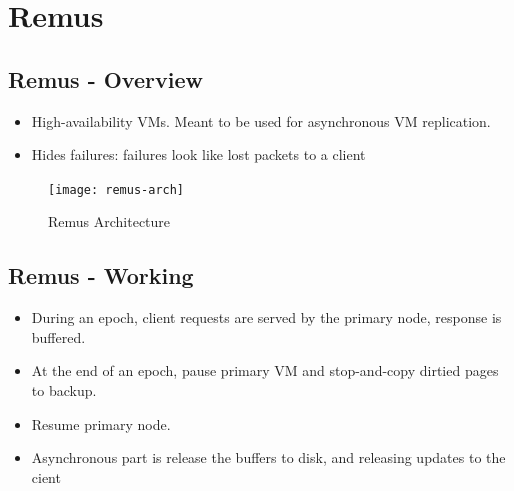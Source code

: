 \documentclass[parskip=half]{scrartcl}
\begin{document}


\newpage

\section{Remus} %
\label{sec:remus}


    \subsection{Remus - Overview} %
    \label{sub:remus_overview}

        \begin{itemize}
            \item High-availability VMs. Meant to be used for asynchronous VM replication.
            \item Hides failures: failures look like lost packets to a client
        \end{itemize}


    \begin{figure}[th]
        \centering
        \texttt{[image: remus-arch]}
        \caption{Remus Architecture}
        \label{fig:remus-arch}
    \end{figure}

    \subsection{Remus - Working} %
    \label{sub:remus_working}

        \begin{itemize}
            \item During an epoch, client requests are served by the primary node, response is buffered.
            \item At the end of an epoch, pause primary VM and stop-and-copy dirtied pages to backup.
            \item Resume primary node.
            \item Asynchronous part is release the buffers to disk, and releasing updates to the cient
        \end{itemize}



\end{document}

